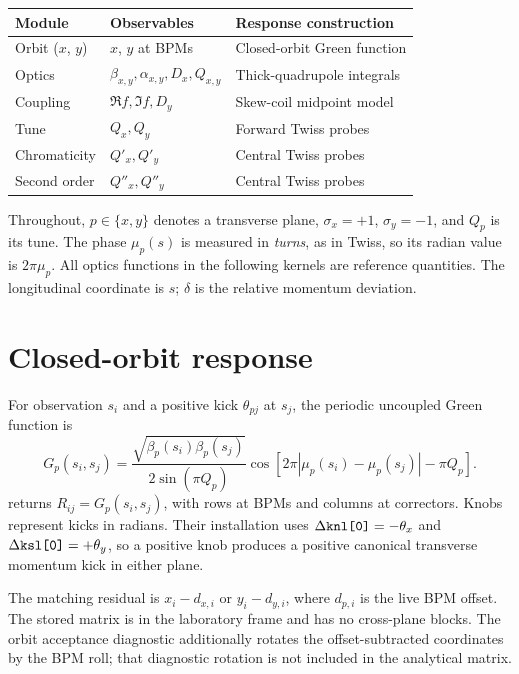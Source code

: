 \documentclass[11pt,a4paper]{article}
\newcommand{\code}[1]{\texttt{\detokenize{#1}}}
\begin{document}
\begin{center}
\begin{tabular}{lll}
\toprule
Module & Observables & Response construction \\
\midrule
Orbit ($x$, $y$) & $x$, $y$ at BPMs & Closed-orbit Green function \\
Optics & $\beta_{x,y},\alpha_{x,y},D_x,Q_{x,y}$ & Thick-quadrupole integrals \\
Coupling & $\Re f,\Im f,D_y$ & Skew-coil midpoint model \\
Tune & $Q_x,Q_y$ & Forward Twiss probes \\
Chromaticity & $Q'_x,Q'_y$ & Central Twiss probes \\
Second order & $Q''_x,Q''_y$ & Central Twiss probes \\
\bottomrule
\end{tabular}
\end{center}

Throughout, $p\in\{x,y\}$ denotes a transverse plane,
$\sigma_x=+1$, $\sigma_y=-1$, and $Q_p$ is its tune. The phase $\mu_p(s)$
is measured in \emph{turns}, as in Twiss, so its radian value is $2\pi\mu_p$.
All optics functions in the following kernels are reference quantities.
The longitudinal coordinate is $s$; $\delta$ is the relative momentum deviation.

\section{Closed-orbit response}

For observation $s_i$ and a positive kick $\theta_{pj}$ at $s_j$, the periodic
uncoupled Green function is
\begin{equation}
 G_p(s_i,s_j)=
 \frac{\sqrt{\beta_p(s_i)\beta_p(s_j)}}{2\sin(\pi Q_p)}
 \cos\!\left[2\pi|\mu_p(s_i)-\mu_p(s_j)|-\pi Q_p\right].
 \label{eq:green}
\end{equation}
\code{orbit_response} returns $R_{ij}=G_p(s_i,s_j)$, with rows at BPMs and
columns at correctors. Knobs represent kicks in radians. Their installation
uses $\Delta\code{knl[0]}=-\theta_x$ and
$\Delta\code{ksl[0]}=+\theta_y$, so a positive knob produces a positive
canonical transverse momentum kick in either plane.

The matching residual is $x_i-d_{x,i}$ or $y_i-d_{y,i}$, where $d_{p,i}$ is
the live BPM offset. The stored matrix is in the laboratory frame and has no
cross-plane blocks. The orbit acceptance diagnostic additionally rotates the
offset-subtracted coordinates by the BPM roll; that diagnostic rotation is
not included in the analytical matrix.
\end{document}
